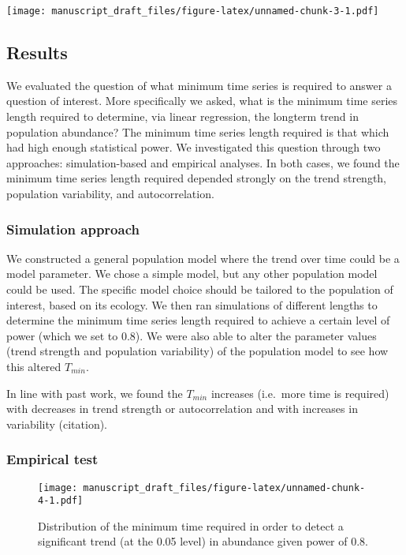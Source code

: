 \documentclass[12pt,]{article}
\begin{document}
\texttt{[image: manuscript\_draft\_files/figure-latex/unnamed-chunk-3-1.pdf]}

\subsection{Results}\label{results}

We evaluated the question of what minimum time series is required to
answer a question of interest. More specifically we asked, what is the
minimum time series length required to determine, via linear regression,
the longterm trend in population abundance? The minimum time series
length required is that which had high enough statistical power. We
investigated this question through two approaches: simulation-based and
empirical analyses. In both cases, we found the minimum time series
length required depended strongly on the trend strength, population
variability, and autocorrelation.

\subsubsection{Simulation approach}\label{simulation-approach}

We constructed a general population model where the trend over time
could be a model parameter. We chose a simple model, but any other
population model could be used. The specific model choice should be
tailored to the population of interest, based on its ecology. We then
ran simulations of different lengths to determine the minimum time
series length required to achieve a certain level of power (which we set
to 0.8). We were also able to alter the parameter values (trend strength
and population variability) of the population model to see how this
altered \(T_{min}\).

In line with past work, we found the \(T_{min}\) increases (i.e.~more
time is required) with decreases in trend strength or autocorrelation
and with increases in variability (citation).

\subsubsection{Empirical test}\label{empirical-test}

\begin{figure}[htbp]
\centering
\texttt{[image: manuscript\_draft\_files/figure-latex/unnamed-chunk-4-1.pdf]}
\caption{Distribution of the minimum time required in order to detect a
significant trend (at the 0.05 level) in abundance given power of
0.8.\label{fig:min_time_dist}}
\end{figure}
\end{document}
